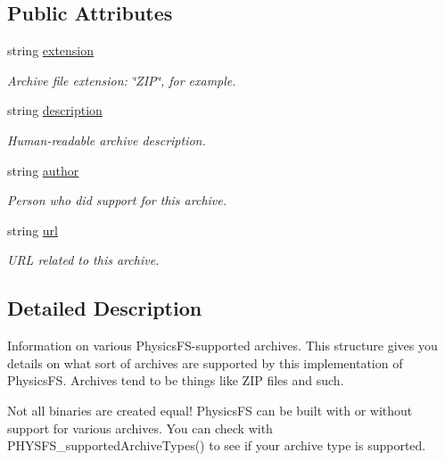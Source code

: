 \subsection*{Public Attributes}
\begin{DoxyCompactItemize}
\item 
string \hyperlink{class_tao_1_1_phys_fs_1_1_fs_1_1_p_h_y_s_f_s___archive_info_a801e286a7debe951b5f08f06bb9210f6}{extension}
\begin{DoxyCompactList}\small\item\em Archive file extension: \char`\"{}ZIP\char`\"{}, for example. \item\end{DoxyCompactList}\item 
string \hyperlink{class_tao_1_1_phys_fs_1_1_fs_1_1_p_h_y_s_f_s___archive_info_a22469d7b75eafcd56c38f0a83b61e39b}{description}
\begin{DoxyCompactList}\small\item\em Human-\/readable archive description. \item\end{DoxyCompactList}\item 
string \hyperlink{class_tao_1_1_phys_fs_1_1_fs_1_1_p_h_y_s_f_s___archive_info_a32d50255676604657813f451b7b9b920}{author}
\begin{DoxyCompactList}\small\item\em Person who did support for this archive. \item\end{DoxyCompactList}\item 
string \hyperlink{class_tao_1_1_phys_fs_1_1_fs_1_1_p_h_y_s_f_s___archive_info_a48d8670b8cee012fe535b64f6234a068}{url}
\begin{DoxyCompactList}\small\item\em URL related to this archive. \item\end{DoxyCompactList}\end{DoxyCompactItemize}


\subsection{Detailed Description}
Information on various PhysicsFS-\/supported archives. This structure gives you details on what sort of archives are supported by this implementation of PhysicsFS. Archives tend to be things like ZIP files and such. 

Not all binaries are created equal! PhysicsFS can be built with or without support for various archives. You can check with PHYSFS\_\-supportedArchiveTypes() to see if your archive type is supported. 

